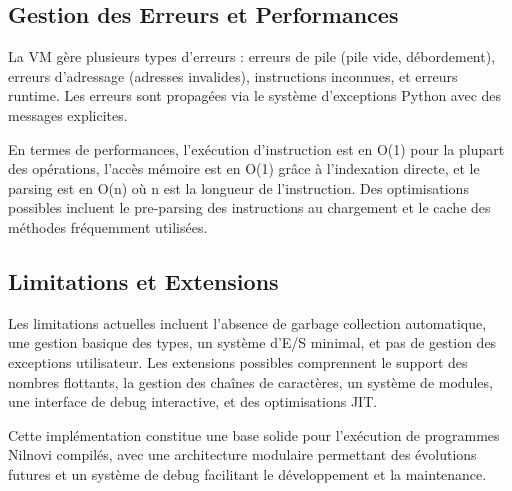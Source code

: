 \documentclass[a4paper, 12pt]{article}
\begin{document}
    \subsection{Gestion des Erreurs et Performances}

    La VM gère plusieurs types d'erreurs : erreurs de pile (pile vide, débordement), erreurs d'adressage (adresses invalides), instructions inconnues, et erreurs runtime. Les erreurs sont propagées via le système d'exceptions Python avec des messages explicites.

    En termes de performances, l'exécution d'instruction est en O(1) pour la plupart des opérations, l'accès mémoire est en O(1) grâce à l'indexation directe, et le parsing est en O(n) où n est la longueur de l'instruction. Des optimisations possibles incluent le pre-parsing des instructions au chargement et le cache des méthodes fréquemment utilisées.

    \subsection{Limitations et Extensions}

    Les limitations actuelles incluent l'absence de garbage collection automatique, une gestion basique des types, un système d'E/S minimal, et pas de gestion des exceptions utilisateur. Les extensions possibles comprennent le support des nombres flottants, la gestion des chaînes de caractères, un système de modules, une interface de debug interactive, et des optimisations JIT.

    Cette implémentation constitue une base solide pour l'exécution de programmes Nilnovi compilés, avec une architecture modulaire permettant des évolutions futures et un système de debug facilitant le développement et la maintenance.
\end{document}

